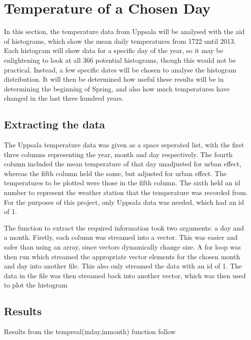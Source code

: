 \documentclass[a4paper,10pt,oneside]{article}
\author{Cameron Robertson}
\date{11/09/17}
\begin{document}
\section{Temperature of a Chosen Day}
\label{sec:intro}

 In this section, the temperature
data from Uppsala will be analysed with the aid of histograms, which show the mean daily
temperatures from 1722 until 2013. Each histogram will show data for a specific day of the year,
so it may be enlightening to look at all 366 potential histograms, though this would
not be practical. Instead, a few specific dates will be chosen to analyse the histogram
distribution. It will then be determined how useful these results will be in determining the beginning
of Spring, and also how much temperatures have changed in the last three hundred years.

\subsection{Extracting the data}
\label{sec:data}

The Uppsala temperature data was given as a space seperated list, with the first three
columns representing the year, month and day respectively. The fourth column included the mean
temperature of that day unadjusted for urban effect, whereas the fifth column held
the same, but adjusted for urban effect. The temperatures to be plotted were those 
in the fifth column. The sixth held an id number to represent the weather station
that the temperature was recorded from. For the purposes of this project, only Uppsala
data was needed, which had an id of 1.

The function to extract the required information took two arguments: a day and a month. Firstly, each column was streamed into a vector. This was
easier and safer than using an array, since vectors dynamically change size. A for loop was then run which streamed the appropriate vector elements for the
chosen month and day into another file. This also only streamed the data with an id of 1. The data in the file was then streamed back into another
vector, which was then used to plot the histogram

\subsection{Results}
\label{sec:res}

Results from the tempreal(inday,inmonth) function follow
\end{document}
